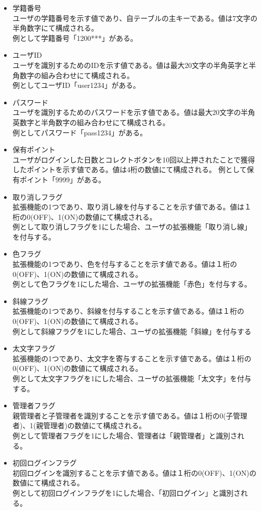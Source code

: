 \documentclass[a4j]{jarticle}
\begin{document}
 \begin{itemize}
\item 学籍番号\\
  ユーザの学籍番号を示す値であり、自テーブルの主キーである。値は7文字の半角数字にて構成される。\\例として学籍番号「1200***」がある。
\item ユーザID\\
  ユーザを識別するためのIDを示す値である。値は最大20文字の半角英字と半角数字の組み合わせにて構成される。
  \\例としてユーザID「user1234」がある。
\item パスワード\\
  ユーザを識別するためのパスワードを示す値である。値は最大20文字の半角英数字と半角数字の組み合わせにて構成される。\\
  例としてパスワード「pass1234」がある。
\item 保有ポイント\\
  ユーザがログインした日数とコレクトボタンを10回以上押されたことで獲得したポイントを示す値である。値は4桁の数値にて構成される。
  例として保有ポイント「9999」がある。
\item 取り消しフラグ\\
  拡張機能の1つであり、取り消し線を付与することを示す値である。値は１桁の0(OFF)、1(ON)の数値にて構成される。\\
  例として取り消しフラグを1にした場合、ユーザの拡張機能「取り消し線」を付与する。
\item 色フラグ\\
  拡張機能の1つであり、色を付与することを示す値である。値は１桁の0(OFF)、1(ON)の数値にて構成される。\\
  例として色フラグを1にした場合、ユーザの拡張機能「赤色」を付与する。
\item 斜線フラグ\\
  拡張機能の1つであり、斜線を付与することを示す値である。値は１桁の0(OFF)、1(ON)の数値にて構成される。\\
  例として斜線フラグを1にした場合、ユーザの拡張機能「斜線」を付与する
\item 太文字フラグ\\
  拡張機能の1つであり、太文字を寄与することを示す値である。値は１桁の0(OFF)、1(ON)の数値にて構成される。\\
  例として太文字フラグを1にした場合、ユーザの拡張機能「太文字」を付与する。
\item 管理者フラグ\\
  親管理者と子管理者を識別することを示す値である。値は１桁の0(子管理者)、1(親管理者)の数値にて構成される。\\
  例として管理者フラグを1にした場合、管理者は「親管理者」と識別される。
\item 初回ログインフラグ\\
  初回ログインを識別することを示す値である。値は１桁の0(OFF)、1(ON)の数値にて構成される。\\例として初回ログインフラグを1にした場合、「初回ログイン」と識別される。


\end{itemize}
\end{document}
